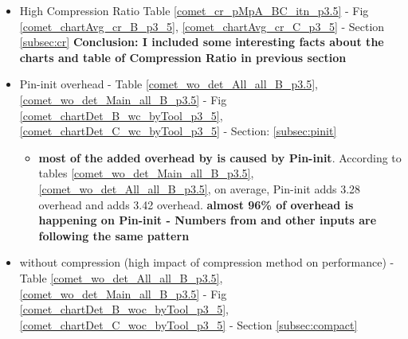 {\begin{itemize}
\begin{itemize}
	\item\textsf{ \textbf{\parlota vs. \callgrind}: According to table \ref{comet_cr_pMpA_BC_itn_p3.5} (from next subsection), for \parlota where the average compression ratio for input C is 644.38, and the correspondent required bandwidth which is 56.38 kB/s, it shows that \parlota can collect \textbf{more than 36 MB} worth of data per core per second where it only needs \textbf{56.38 kB/s} bandwidth, while \callgrind can only collects \textbf{less than 100 kB} of informative data and still adds more overhead comparing to either \parlota or \parlotm. \textbf{Conclusion: The amount of informative data can be collected with \parlota  are 360x larger than \callgrind and the overhead \parlota adds is less than 0.6x smaller than \callgrind}}
	\item \textsf{\textbf{\parlotm vs. \callgrind} Above story is true also for \parlotm. According to table \ref{comet_cr_pMpA_BC_itn_p3.5}, for \parlotm where the average compression ratio for input C is 1117.01, and the correspondent required bandwidth which is 7.84 kB/s, shows that \parlotm can collect \textbf{more than 8.5 MB} worth of data per core per second where it only needs \textbf{7.84.38 kB/s} bandwidth, while \callgrind can only collects \textbf{less than 100 kB} of informative data and still adds more overhead comparing to either \parlota or \parlotm. \textbf{Conclusion: The amount of informative data can be collected with \parlotm  are 85x larger than \callgrind and the overhead \parlotm adds is about 0.4x smaller than \callgrind}}
	\end{itemize}
	
	
\item \textsf{High Compression Ratio Table \ref{comet_cr_pMpA_BC_itn_p3.5} - Fig \ref{comet_chartAvg_cr_B_p3_5}, \ref{comet_chartAvg_cr_C_p3_5} - Section \ref{subsec:cr}
\textbf{Conclusion: I included some interesting facts about the charts and table of Compression Ratio in previous section}}
\item \textsf{ Pin-init overhead - Table \ref{comet_wo_det_All_all_B_p3.5}, \ref{comet_wo_det_Main_all_B_p3.5} - Fig \ref{comet_chartDet_B_wc_byTool_p3_5}, \ref{comet_chartDet_C_wc_byTool_p3_5} - Section: \ref{subsec:pinit}}
	\begin{itemize}
	\item \textsf{\textbf{most of the added overhead by \parlot is caused by Pin-init}. According to tables \ref{comet_wo_det_Main_all_B_p3.5}, \ref{comet_wo_det_All_all_B_p3.5}, on average, Pin-init adds 3.28 overhead and \parlota adds 3.42 overhead. \textbf{almost 96\% of \parlota overhead is happening on Pin-init - Numbers from \parlotm and other inputs are following the same pattern}}
	\end{itemize}
\item \textsf{ \parlot without compression  (high impact of compression method on performance) - Table \ref{comet_wo_det_All_all_B_p3.5}, \ref{comet_wo_det_Main_all_B_p3.5}  - Fig \ref{comet_chartDet_B_woc_byTool_p3_5}, \ref{comet_chartDet_C_woc_byTool_p3_5} - Section \ref{subsec:compact}}


\end{itemize}}
